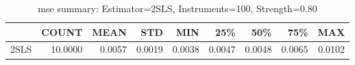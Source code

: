 \begin{table}[ht]
\centering
\caption{mse summary: Estimator=2SLS, Instruments=100, Strength=0.80}
\begin{tabular}{lrrrrrrrr}
\toprule
 & COUNT & MEAN & STD & MIN & 25\% & 50\% & 75\% & MAX \\
\midrule
2SLS & 10.0000 & 0.0057 & 0.0019 & 0.0038 & 0.0047 & 0.0048 & 0.0065 & 0.0102 \\
\bottomrule
\end{tabular}
\end{table}
